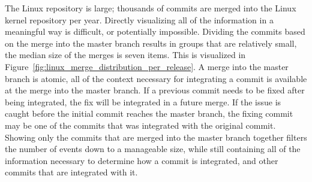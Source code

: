 The Linux repository is large;
thousands of commits are merged into the Linux kernel repository per
year.
Directly visualizing all of the information in a meaningful way is
difficult, or potentially impossible.
Dividing the commits based on the merge into the master branch results
in groups that are relatively small,
the median size of the merges is seven items.
This is visualized in
Figure~\ref{fig:linux_merge_distribution_per_release}.
A merge into the master branch is atomic, all of the context necessary
for integrating a commit is available at the merge into the master
branch.
If a previous commit needs to be fixed after being integrated, the fix
will be integrated in a future merge.
If the issue is caught before the initial commit reaches the master
branch, the fixing commit may be one of the commits that was integrated
with the original commit.
Showing only the commits that are merged into the master
branch together filters the number of events down to a manageable size,
while still containing all of the information necessary to determine how
a commit is integrated, and other commits that are integrated with it.

